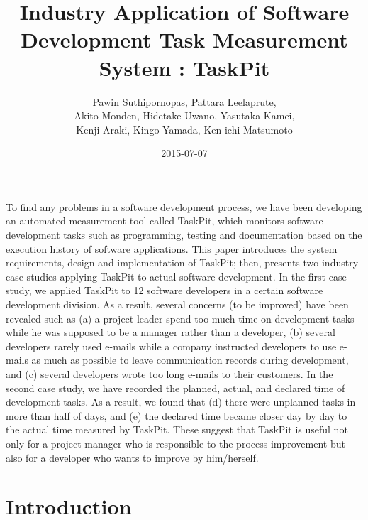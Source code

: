 \documentclass [paper]{ieice}
\title {Industry Application of Software Development Task Measurement System : TaskPit}
\author{Pawin Suthipornopas,
		Pattara Leelaprute, \\
		Akito Monden, 
		Hidetake Uwano, 
		Yasutaka Kamei, \\
		Kenji Araki, 
		Kingo Yamada, 
		Ken-ichi Matsumoto}
\date {2015-07-07}
\begin{document}
\maketitle
\begin {summary}
	To find any problems in a software development process, we have been developing an automated measurement tool called TaskPit, which monitors software development tasks such as programming, testing and documentation based on the execution history of software applications. This paper introduces the system requirements, design and implementation of TaskPit; then, presents two industry case studies applying TaskPit to actual software development. In the first case study, we applied TaskPit to 12 software developers in a certain software development division. As a result, several concerns (to be improved) have been revealed such as (a) a project leader spend too much time on development tasks while he was supposed to be a manager rather than a developer, (b) several developers rarely used e-mails while a company instructed developers to use e-mails as much as possible to leave communication records during development, and (c) several developers wrote too long e-mails to their customers. In the second case study, we have recorded the planned, actual, and declared time of development tasks. As a result, we found that (d) there were unplanned tasks in more than half of days, and (e) the declared time became closer day by day to the actual time measured by TaskPit. These suggest that TaskPit is useful not only for a project manager who is responsible to the process improvement but also for a developer who wants to improve by him/herself.
\end {summary}
	
\section {Introduction}
	
\end{document}

